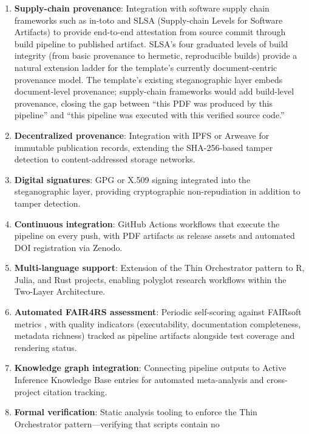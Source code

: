 \documentclass[
]{article}
\providecommand{\tightlist}{%
  \setlength{\itemsep}{0pt}\setlength{\parskip}{0pt}}
\begin{document}
\begin{enumerate}
\def\labelenumi{\arabic{enumi}.}
\tightlist
\item
  \textbf{Supply-chain provenance}: Integration with software supply
  chain frameworks such as in-toto \citep{torresarias2019intoto} and
  SLSA (Supply-chain Levels for Software Artifacts)
  \citep{openssf2023slsa} to provide end-to-end attestation from source
  commit through build pipeline to published artifact. SLSA's four
  graduated levels of build integrity (from basic provenance to
  hermetic, reproducible builds) provide a natural extension ladder for
  the template's currently document-centric provenance model. The
  template's existing steganographic layer embeds document-level
  provenance; supply-chain frameworks would add build-level provenance,
  closing the gap between ``this PDF was produced by this pipeline'' and
  ``this pipeline was executed with this verified source code.''
\item
  \textbf{Decentralized provenance}: Integration with IPFS or Arweave
  for immutable publication records, extending the SHA-256-based tamper
  detection to content-addressed storage networks.
\item
  \textbf{Digital signatures}: GPG or X.509 signing integrated into the
  steganographic layer, providing cryptographic non-repudiation in
  addition to tamper detection.
\item
  \textbf{Continuous integration}: GitHub Actions workflows that execute
  the pipeline on every push, with PDF artifacts as release assets and
  automated DOI registration via Zenodo.
\item
  \textbf{Multi-language support}: Extension of the Thin Orchestrator
  pattern to R, Julia, and Rust projects, enabling polyglot research
  workflows within the Two-Layer Architecture.
\item
  \textbf{Automated FAIR4RS assessment}: Periodic self-scoring against
  FAIRsoft metrics \citep{garijo2024fairsoft}, with quality indicators
  (executability, documentation completeness, metadata richness) tracked
  as pipeline artifacts alongside test coverage and rendering status.
\item
  \textbf{Knowledge graph integration}: Connecting pipeline outputs to
  Active Inference Knowledge Base entries for automated meta-analysis
  and cross-project citation tracking.
\item
  \textbf{Formal verification}: Static analysis tooling to enforce the
  Thin Orchestrator pattern---verifying that scripts contain no

\end{enumerate}
\end{document}
